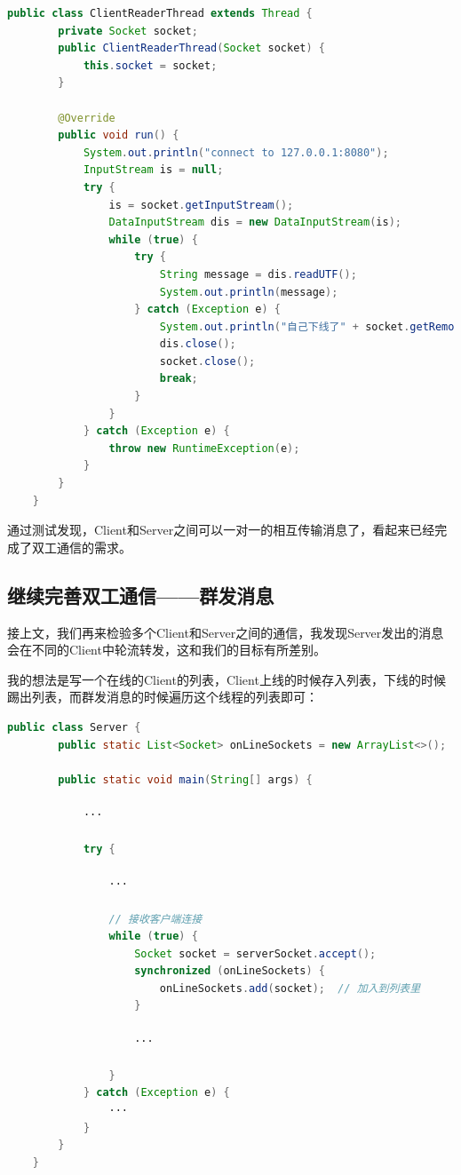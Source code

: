 \documentclass{article}
\begin{document}
	\begin{lstlisting}[language=Java, title=实现ClientReaderThread.java, tabsize=4]
	public class ClientReaderThread extends Thread {
		private Socket socket;
		public ClientReaderThread(Socket socket) {
			this.socket = socket;
		}
		
		@Override
		public void run() {
			System.out.println("connect to 127.0.0.1:8080");
			InputStream is = null;
			try {
				is = socket.getInputStream();
				DataInputStream dis = new DataInputStream(is);
				while (true) {
					try {
						String message = dis.readUTF();
						System.out.println(message);
					} catch (Exception e) {
						System.out.println("自己下线了" + socket.getRemoteSocketAddress());
						dis.close();
						socket.close();
						break;
					}
				}
			} catch (Exception e) {
				throw new RuntimeException(e);
			}
		}
	}
	\end{lstlisting}
	
	通过测试发现，Client和Server之间可以一对一的相互传输消息了，看起来已经完成了双工通信的需求。
	
	\subsection{继续完善双工通信——群发消息}
	
	接上文，我们再来检验多个Client和Server之间的通信，我发现Server发出的消息会在不同的Client中轮流转发，这和我们的目标有所差别。
	
	我的想法是写一个在线的Client的列表，Client上线的时候存入列表，下线的时候踢出列表，而群发消息的时候遍历这个线程的列表即可：
	
	\begin{lstlisting}[language=Java, title=向Server中添加onLineSockets列表, tabsize=4]
	public class Server {
		public static List<Socket> onLineSockets = new ArrayList<>();
		
		public static void main(String[] args) {
			
			···
			
			try {
				
				···
				
				// 接收客户端连接
				while (true) {
					Socket socket = serverSocket.accept();
					synchronized (onLineSockets) {
						onLineSockets.add(socket);  // 加入到列表里
					}
					
					···
					
				}
			} catch (Exception e) {
				···
			}
		}
	}
	\end{lstlisting}
	
\end{document}
